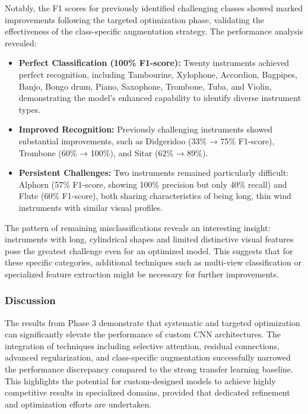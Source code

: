 
Notably, the F1 scores for previously identified challenging classes showed marked improvements following the targeted optimization phase, validating the effectiveness of the class-specific augmentation strategy. The performance analysis revealed:

\begin{itemize}
    \item \textbf{Perfect Classification (100\% F1-score):} Twenty instruments achieved perfect recognition, including Tambourine, Xylophone, Accordion, Bagpipes, Banjo, Bongo drum, Piano, Saxophone, Trombone, Tuba, and Violin, demonstrating the model's enhanced capability to identify diverse instrument types.
    
    \item \textbf{Improved Recognition:} Previously challenging instruments showed substantial improvements, such as Didgeridoo (33\% → 75\% F1-score), Trombone (60\% → 100\%), and Sitar (62\% → 89\%).
    
    \item \textbf{Persistent Challenges:} Two instruments remained particularly difficult: Alphorn (57\% F1-score, showing 100\% precision but only 40\% recall) and Flute (60\% F1-score), both sharing characteristics of being long, thin wind instruments with similar visual profiles.
\end{itemize}

The pattern of remaining misclassifications reveals an interesting insight: instruments with long, cylindrical shapes and limited distinctive visual features pose the greatest challenge even for an optimized model. This suggests that for these specific categories, additional techniques such as multi-view classification or specialized feature extraction might be necessary for further improvements.

\subsubsection{Discussion}
The results from Phase 3 demonstrate that systematic and targeted optimization can significantly elevate the performance of custom CNN architectures. The integration of techniques including selective attention, residual connections, advanced regularization, and class-specific augmentation successfully narrowed the performance discrepancy compared to the strong transfer learning baseline. This highlights the potential for custom-designed models to achieve highly competitive results in specialized domains, provided that dedicated refinement and optimization efforts are undertaken.
